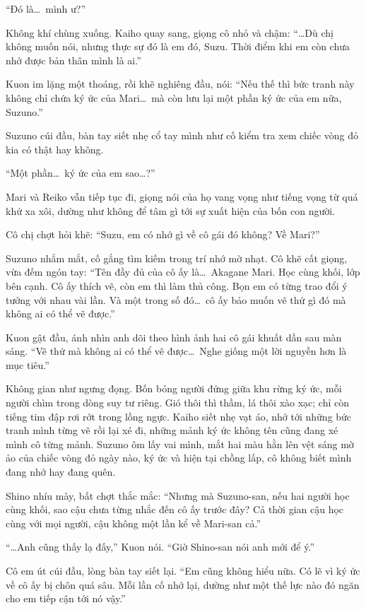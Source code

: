 \documentclass[../main.tex]{subfiles}
\begin{document}
``Đó là\dots\ mình ư?''

Không khí chùng xuống. Kaiho quay sang, giọng cô nhỏ và chậm: ``\dots Dù chị không muốn nói, nhưng thực sự đó là em đó, Suzu. Thời điểm khi em còn chưa nhớ được bản thân mình là ai.''

Kuon im lặng một thoáng, rồi khẽ nghiêng đầu, nói: ``Nếu thế thì bức tranh này không chỉ chứa ký ức của Mari\dots\ mà còn lưu lại một phần ký ức của em nữa, Suzuno.''

Suzuno cúi đầu, bàn tay siết nhẹ cổ tay mình như cố kiểm tra xem chiếc vòng đỏ kia có thật hay không.

``Một phần\dots\ ký ức của em sao\dots?''

Mari và Reiko vẫn tiếp tục đi, giọng nói của họ vang vọng như tiếng vọng từ quá khứ xa xôi, dường như không để tâm gì tới sự xuất hiện của bốn con người.

Cô chị chợt hỏi khẽ: ``Suzu, em có nhớ gì về cô gái đó không? Về Mari?''

Suzuno nhắm mắt, cố gắng tìm kiếm trong trí nhớ mờ nhạt. Cô khẽ cất giọng, vừa đếm ngón tay: ``Tên đầy đủ của cô ấy là\dots\ Akagane Mari. Học cùng khối, lớp bên cạnh. Cô ấy thích vẽ, còn em thì làm thủ công.
Bọn em có từng trao đổi ý tưởng với nhau vài lần. Và một trong số đó\dots\ cô ấy bảo muốn vẽ thứ gì đó mà không ai có thể vẽ được.''

Kuon gật đầu, ánh nhìn anh dõi theo hình ảnh hai cô gái khuất dần sau màn sáng. ``Vẽ thứ mà không ai có thể vẽ được\dots\ Nghe giống một lời nguyền hơn là mục tiêu.''

Không gian như ngưng đọng. Bốn bóng người đứng giữa khu rừng ký ức, mỗi người chìm trong dòng suy tư riêng. Gió thôi thì thầm, lá thôi xào xạc; chỉ còn tiếng tim đập rơi rớt trong lồng ngực. Kaiho siết nhẹ vạt áo, nhớ tới những bức tranh mình từng vẽ rồi lại xé đi, những mảnh ký ức không tên cũng đang xé mình cô từng mảnh. Suzuno ôm lấy vai mình, mắt hai màu hằn lên vệt sáng mờ ảo của chiếc vòng đỏ ngày nào, ký ức và hiện tại chồng lấp, cô không biết mình đang nhớ hay đang quên.

Shino nhíu mày, bất chợt thắc mắc: ``Nhưng mà Suzuno-san, nếu hai người học cùng khối, sao cậu chưa từng nhắc đến cô ấy trước đây? Cả thời gian cậu học cùng với mọi người, cậu không một lần kể về Mari-san cả.''

``\dots Anh cũng thấy lạ đấy,'' Kuon nói. ``Giờ Shino-san nói anh mới để ý.''

Cô em út cúi đầu, lòng bàn tay siết lại. ``Em cũng không hiểu nữa. Có lẽ vì ký ức về cô ấy bị chôn quá sâu. Mỗi lần cố nhớ lại, dường như một thế lực nào đó ngăn cho em tiếp cận tới nó vậy.''
\end{document}
